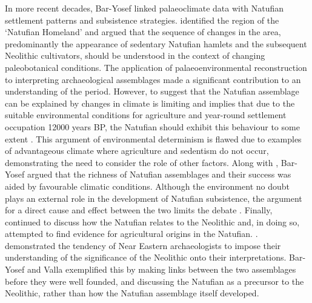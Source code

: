 \documentclass[%
	]{ijsra}
\begin{document}
In more recent decades, Bar-Yosef linked palaeoclimate data with Natufian settlement patterns and subsistence strategies. \textcite[157]{Bar-Yosef_1998} identified the region of the ‘Natufian Homeland’ and argued that the sequence of changes in the area, predominantly the appearance of sedentary Natufian hamlets and the subsequent Neolithic cultivators, should be understood in the context of changing paleobotanical conditions. The application of palaeoenvironmental reconstruction to interpreting archaeological assemblages made a significant contribution to an understanding of the period. 
However, to suggest that the Natufian assemblage can be explained by changes in climate is limiting and implies that due to the suitable environmental conditions for agriculture and year-round settlement occupation \num{12000} years BP, the Natufian should exhibit this behaviour to some extent \parencite[161]{Bar-Yosef_1998}. This argument of environmental determinism is flawed due to examples of advantageous climate where agriculture and sedentism do not occur, demonstrating the need to consider the role of other factors. 
Along with \textcite{Valla_1999}, Bar-Yosef argued that the richness of Natufian assemblages and their success was aided by favourable climatic conditions. 
Although the environment no doubt plays an external role in the development of Natufian subsistence, the argument for a direct cause and effect between the two limits the debate \parencite{Fletcher_2007}. 
Finally, \textcite[175]{Bar-Yosef_2011} continued to discuss how the Natufian relates to the Neolithic and, in doing so, attempted to find evidence for agricultural origins in the Natufian. 
\textcite{Finlayson_2013}.
demonstrated the tendency of Near Eastern archaeologists to impose their understanding of the significance of the Neolithic onto their interpretations. Bar-Yosef and Valla exemplified this by making links between the two assemblages before they were well founded, and discussing the Natufian as a precursor to the Neolithic, rather than how the Natufian assemblage itself developed. 
\end{document}
